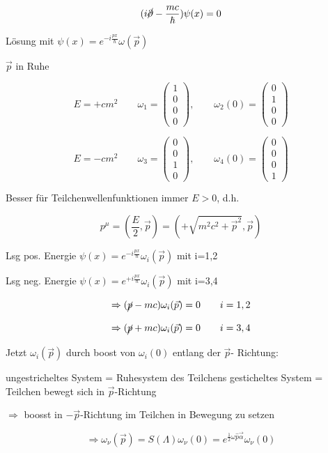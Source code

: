 \[(i\cancel \partial - \frac{mc}{\hbar})\psi(x) = 0\]

Lösung mit \(\psi(x) = e^{-i\frac{px}{\hbar}}\omega(\vec p)\)

\(\vec p\) in Ruhe

\[E = +cm^2\qquad \omega_1 = \begin{pmatrix} 1\\ 0 \\ 0\\ 0 \end{pmatrix},\qquad \omega_2(0) = \begin{pmatrix} 0\\ 1 \\ 0\\ 0 \end{pmatrix} \]

\[E = -cm^2\qquad \omega_3 = \begin{pmatrix} 0\\ 0 \\ 1\\ 0 \end{pmatrix},\qquad  \omega_4(0) = \begin{pmatrix} 0\\ 0 \\ 0\\ 1 \end{pmatrix} \]

Besser für Teilchenwellenfunktionen immer \(E>0\), d.h.

\[p^\mu = (\frac{E}{2},\vec p) = (+\sqrt{m^2c^2+\vec p^2},\vec p)\]

Lsg pos. Energie \(\psi(x) = e^{-i\frac{px}{\hbar}}\omega_i(\vec p)\) mit i=1,2

Lsg neg. Energie \(\psi(x) = e^{+i\frac{px}{\hbar}}\omega_i(\vec p)\) mit i=3,4

\[\Rightarrow (\cancel p -mc) \omega_i(\vec p) = 0 \qquad i=1,2\]

\[\Rightarrow (\cancel p +mc) \omega_i(\vec p) = 0 \qquad i=3,4\]

Jetzt \(\omega_i(\vec p)\) durch boost von \(\omega_i(0)\) entlang der \(\vec p\)- Richtung:

ungestricheltes System = Ruhesystem des Teilchens
gesticheltes System = Teilchen bewegt sich in \(\vec p \)-Richtung

\(\Rightarrow \) boosst in \(-\vec p\)-Richtung im Teilchen in Bewegung zu setzen

\[\Rightarrow \omega_\nu(\vec p) = S(\Lambda)\omega_\nu(0) = e^{\frac{1}{2}\omega\hat p\vec\alpha}\omega_\nu(0)  \]

